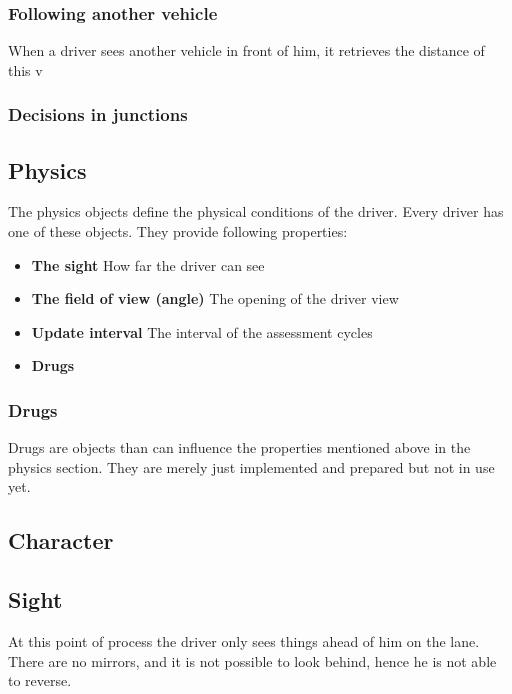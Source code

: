 \subsubsection{Following another vehicle}

When a driver sees another vehicle in front of him, it retrieves the distance
of this v

% 

\subsubsection{Decisions in junctions}

\subsection{Physics}
\label{sec:physics}

The physics objects define the physical conditions of the driver. Every
driver has one of these objects. They provide following properties:

\begin{itemize}
\item \textbf{The sight} How far the driver can see
\item \textbf{The field of view (angle)} The opening of the driver view
\item \textbf{Update interval} The interval of the assessment cycles
\item \textbf{Drugs}
\end{itemize}

\subsubsection{Drugs}
\label{sec:drugs}

Drugs are objects than can influence the properties mentioned above in the
physics section. They are merely just implemented and prepared but not 
in use yet.

\subsection{Character}
\label{sec:character}

\subsection{Sight}
\label{sec:sight}

At this point of process the driver only sees things ahead of him on the
lane. There are no mirrors, and it is not possible to look behind, hence
he is not able to reverse.\\


